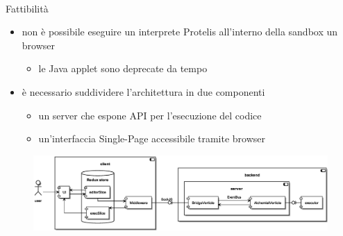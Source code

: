     \begin{frame}{\insertsectionhead}
      \framesubtitle{\insertsubsectionhead}

      \begin{block}{Fattibilità}
        \begin{itemize}
          \item
            non è possibile eseguire un interprete Protelis all'interno della sandbox un browser
            \begin{itemize}
              \item le Java applet sono deprecate da tempo
            \end{itemize}
          \item
            è necessario suddividere l'architettura in due componenti
            \begin{itemize}
              \item un server che espone API per l'esecuzione del codice
              \item un'interfaccia Single-Page accessibile tramite browser
            \end{itemize}
        \end{itemize}
      \end{block}

      \begin{figure}
        \includegraphics[width=.8\textwidth]{../res/uml/architecture-design.eps}
      \end{figure}

    \end{frame}

